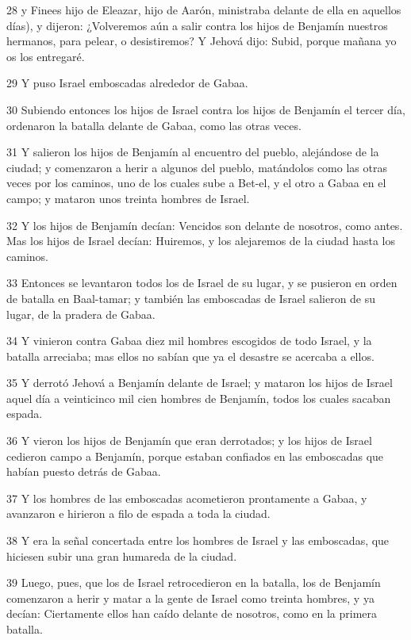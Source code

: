 \par 28 y Finees hijo de Eleazar, hijo de Aarón, ministraba delante de ella en aquellos días), y dijeron: ¿Volveremos aún a salir contra los hijos de Benjamín nuestros hermanos, para pelear, o desistiremos? Y Jehová dijo: Subid, porque mañana yo os los entregaré.
\par 29 Y puso Israel emboscadas alrededor de Gabaa.
\par 30 Subiendo entonces los hijos de Israel contra los hijos de Benjamín el tercer día, ordenaron la batalla delante de Gabaa, como las otras veces.
\par 31 Y salieron los hijos de Benjamín al encuentro del pueblo, alejándose de la ciudad; y comenzaron a herir a algunos del pueblo, matándolos como las otras veces por los caminos, uno de los cuales sube a Bet-el, y el otro a Gabaa en el campo; y mataron unos treinta hombres de Israel.
\par 32 Y los hijos de Benjamín decían: Vencidos son delante de nosotros, como antes. Mas los hijos de Israel decían: Huiremos, y los alejaremos de la ciudad hasta los caminos.
\par 33 Entonces se levantaron todos los de Israel de su lugar, y se pusieron en orden de batalla en Baal-tamar; y también las emboscadas de Israel salieron de su lugar, de la pradera de Gabaa.
\par 34 Y vinieron contra Gabaa diez mil hombres escogidos de todo Israel, y la batalla arreciaba; mas ellos no sabían que ya el desastre se acercaba a ellos.
\par 35 Y derrotó Jehová a Benjamín delante de Israel; y mataron los hijos de Israel aquel día a veinticinco mil cien hombres de Benjamín, todos los cuales sacaban espada.
\par 36 Y vieron los hijos de Benjamín que eran derrotados; y los hijos de Israel cedieron campo a Benjamín, porque estaban confiados en las emboscadas que habían puesto detrás de Gabaa.
\par 37 Y los hombres de las emboscadas acometieron prontamente a Gabaa, y avanzaron e hirieron a filo de espada a toda la ciudad.
\par 38 Y era la señal concertada entre los hombres de Israel y las emboscadas, que hiciesen subir una gran humareda de la ciudad.
\par 39 Luego, pues, que los de Israel retrocedieron en la batalla, los de Benjamín comenzaron a herir y matar a la gente de Israel como treinta hombres, y ya decían: Ciertamente ellos han caído delante de nosotros, como en la primera batalla.
